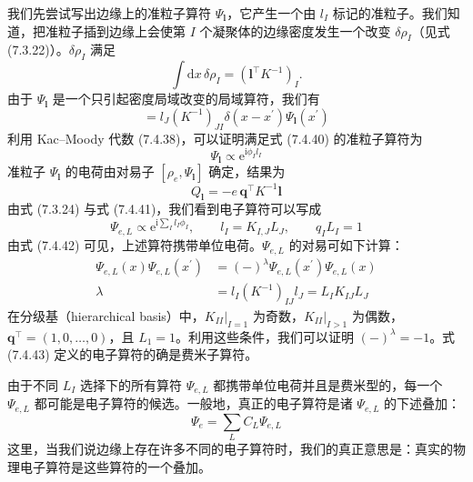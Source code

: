 我们先尝试写出边缘上的准粒子算符 $\Psi_{\pmb{l}}$，它产生一个由 $l_{I}$ 标记的准粒子。我们知道，把准粒子插到边缘上会使第 $I$ 个凝聚体的边缘密度发生一个改变 $\delta\rho_{I}$（见式 (7.3.22)）。$\delta\rho_{I}$ 满足
\begin{equation*}
\int\mathrm{d}x\,\delta\rho_{I}=(\pmb{l}^{\top}K^{-1})_{I}.
\end{equation*}
由于 $\Psi_{\pmb{l}}$ 是一个只引起密度局域改变的局域算符，我们有
\begin{equation*}
[\rho_{I}(x),\Psi_{\pmb{l}}(x^{\prime})]=l_{J}(K^{-1})_{JI}\delta(x-x^{\prime})\Psi_{\pmb{l}}(x^{\prime}) \tag{7.4.40}
\end{equation*}
利用 Kac--Moody 代数 (7.4.38)，可以证明满足式 (7.4.40) 的准粒子算符为
\begin{equation*}
\Psi_{\pmb{l}}\propto\mathrm{e}^{\mathrm{i}\phi_{I}l_{I}} \tag{7.4.41}
\end{equation*}
准粒子 $\Psi_{\pmb{l}}$ 的电荷由对易子 $[\rho_{e},\Psi_{\pmb{l}}]$ 确定，结果为
\begin{equation*}
Q_{\pmb{l}}=-e\,\pmb{q}^{\top}K^{-1}\pmb{l} \tag{7.4.42}
\end{equation*}
由式 (7.3.24) 与式 (7.4.41)，我们看到电子算符可以写成
\begin{equation*}
\Psi_{e,L}\propto\mathrm{e}^{\mathrm{i}\sum_{I}l_{I}\phi_{I}},\qquad
l_{I}=K_{I,J}L_{J},\qquad q_{I}L_{I}=1 \tag{7.4.43}
\end{equation*}
由式 (7.4.42) 可见，上述算符携带单位电荷。$\Psi_{e,L}$ 的对易可如下计算：
\begin{align*}
\Psi_{e,L}(x)\Psi_{e,L}(x^{\prime})&=(-)^{\lambda}\Psi_{e,L}(x^{\prime})\Psi_{e,L}(x)\\
\lambda&=l_{I}(K^{-1})_{IJ}l_{J}=L_{I}K_{IJ}L_{J} \tag{7.4.44}
\end{align*}
在分级基（hierarchical basis）中，$K_{II}|_{I=1}$ 为奇数，$K_{II}|_{I>1}$ 为偶数，$\pmb{q}^{\top}=(1,0,\ldots,0)$，且 $L_{1}=1$。利用这些条件，我们可以证明 $(-)^{\lambda}=-1$。式 (7.4.43) 定义的电子算符的确是费米子算符。

由于不同 $L_{I}$ 选择下的所有算符 $\Psi_{e,L}$ 都携带单位电荷并且是费米型的，每一个 $\Psi_{e,L}$ 都可能是电子算符的候选。一般地，真正的电子算符是诸 $\Psi_{e,L}$ 的下述叠加：
\begin{equation*}
\Psi_{e}=\sum_{L}C_{L}\Psi_{e,L}
\end{equation*}
这里，当我们说边缘上存在许多不同的电子算符时，我们的真正意思是：真实的物理电子算符是这些算符的一个叠加。

